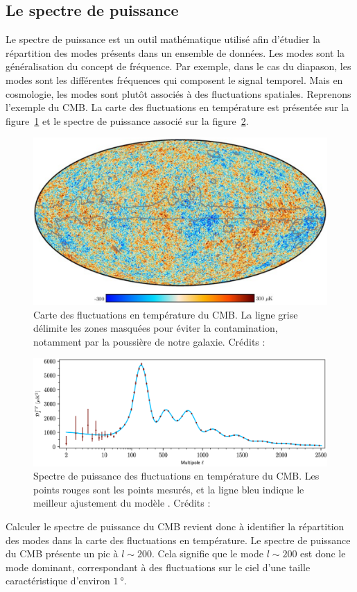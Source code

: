 \documentclass[11pt, twoside, a4paper, openright]{report}
\begin{document}
\subsection{Le spectre de puissance}

Le spectre de puissance est un outil mathématique utilisé afin d'étudier la répartition des modes présents dans un ensemble de données. Les modes sont la généralisation du concept de fréquence. Par exemple, dans le cas du diapason, les modes sont les différentes fréquences qui composent le signal temporel. Mais en cosmologie, les modes sont plutôt associés à des fluctuations spatiales. Reprenons l'exemple du CMB. La carte des fluctuations en température est présentée sur la figure~\ref{fig:carte_cmb} et le spectre de puissance associé sur la figure~\ref{fig:spectre_cmb}. 
\begin{figure}[h]
  \centering
  \includegraphics[scale=0.35]{carte_cmb}
  \caption{Carte des fluctuations en température du CMB. La ligne grise délimite les zones masquées pour éviter la contamination, notamment par la poussière de notre galaxie. Crédits : \cite{CITE:planck2018 legacy}}
  \label{fig:carte_cmb}
\end{figure}
\begin{figure}
  \centering
  \includegraphics[scale=0.37]{spectre_cmb}
  \caption{Spectre de puissance des fluctuations en température du CMB. Les points rouges sont les points mesurés, et la ligne bleu indique le meilleur ajustement du modèle \lcdm{}. Crédits : \cite{CITE:planck2018 legacy}}
  \label{fig:spectre_cmb}
\end{figure}
Calculer le spectre de puissance du CMB revient donc à identifier la répartition des modes  dans la carte des fluctuations en température. Le spectre de puissance du CMB présente un pic à $l \sim 200$. Cela signifie que le mode $l \sim 200$ est donc le mode dominant, correspondant à des fluctuations sur le ciel d'une taille caractéristique d'environ $\SI{1}{\degree}$.
\end{document}
